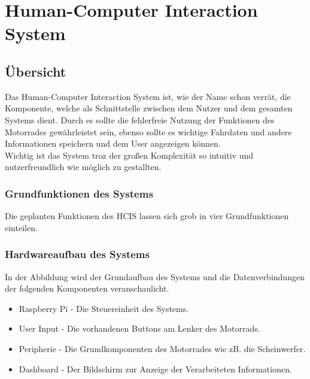 

\chapter{Human-Computer Interaction System}

\section{Übersicht}
Das Human-Computer Interaction System ist, wie der Name schon verrät, die Komponente, welche als Schnittstelle zwischen dem Nutzer und dem gesamten Systems dient. Durch es sollte die fehlerfreie Nutzung der Funktionen des Motorrades gewährleistet sein, ebenso sollte es wichtige Fahrdaten und andere Informationen speichern und dem User angezeigen können.\\
Wichtig ist das System troz der großen Komplexität so intuitiv und nutzerfreundlich wie möglich zu gestallten.

\subsection{Grundfunktionen des Systems}
Die geplanten Funktionen des HCIS lassen sich grob in vier Grundfunktionen einteilen.
\newpage

\subsection{Hardwareaufbau des Systems}
In der Abbildung wird der Grundaufbau des Systems und die Datenverbindungen der folgenden  Komponenten veranschaulicht.

\begin{itemize}
	\item Raspberry Pi - Die Steuereinheit des Systems.
	\item User Input - Die vorhandenen Buttons am Lenker des Motorrads.
	\item Peripherie - Die Grundkomponenten des Motorrades wie zB. die Scheinwerfer. 
	\item Dashboard - Der Bildschirm zur Anzeige der Verarbeiteten Informationen.
\end{itemize}

